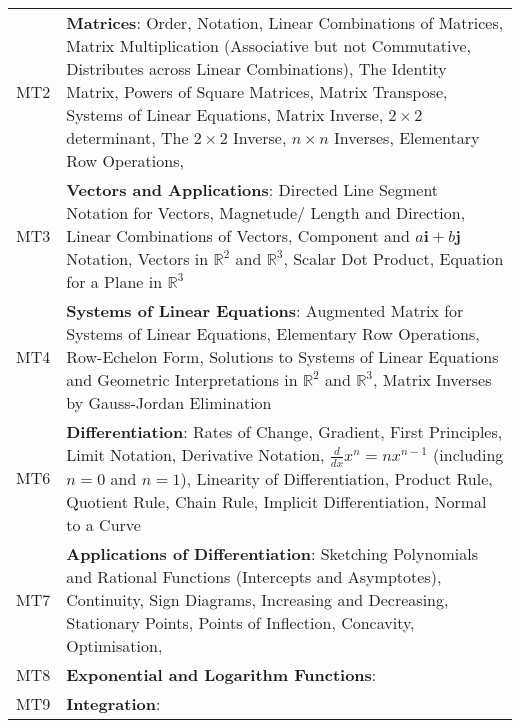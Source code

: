 \documentclass[varwidth=144mm, 12pt]{standalone}
\begin{document}
\begin{longtable}{lp{}}
MT2 & \textbf{Matrices}: Order, Notation, Linear Combinations of Matrices, Matrix Multiplication (Associative but not Commutative, Distributes across Linear Combinations), The Identity Matrix, Powers of Square Matrices, Matrix Transpose, Systems of Linear Equations, Matrix Inverse, $2 \times 2$ determinant, The $2 \times 2$ Inverse, $n \times n$ Inverses, Elementary Row Operations, \\
MT3 & \textbf{Vectors and Applications}: Directed Line Segment Notation for Vectors, Magnetude/ Length and Direction, Linear Combinations of Vectors, Component and $a\mathbf{i} + b\mathbf{j}$ Notation, Vectors in $\mathbb{R}^2$ and $\mathbb{R}^3$, Scalar Dot Product, Equation for a Plane in $\mathbb{R}^3$ \\
MT4 & \textbf{Systems of Linear Equations}: Augmented Matrix for Systems of Linear Equations, Elementary Row Operations, Row-Echelon Form, Solutions to Systems of Linear Equations and Geometric Interpretations in $\mathbb{R}^2$ and $\mathbb{R}^3$, Matrix Inverses by Gauss-Jordan Elimination \\
MT6 & \textbf{Differentiation}: Rates of Change, Gradient, First Principles, Limit Notation, Derivative Notation, $\frac{d}{dx}x^n = nx^{n-1}$ (including $n = 0$ and $n = 1$), Linearity of Differentiation, Product Rule, Quotient Rule, Chain Rule, Implicit Differentiation, Normal to a Curve \\
MT7 & \textbf{Applications of Differentiation}: Sketching Polynomials and Rational Functions (Intercepts and Asymptotes), Continuity, Sign Diagrams, Increasing and Decreasing, Stationary Points, Points of Inflection, Concavity, Optimisation, \\
MT8 & \textbf{Exponential and Logarithm Functions}: \\
MT9 & \textbf{Integration}: \\
\end{longtable}
\end{document}
